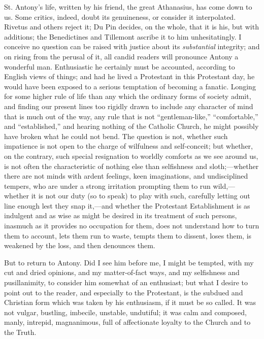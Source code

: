 St. Antony's life, written by his friend, the great Athanasius, has
come down to us. Some critics, indeed, doubt its genuineness, or
consider it interpolated. Rivetus and others reject it; Du Pin
decides, on the whole, that it is his, but with additions; the
Benedictines and Tillemont ascribe it to him unhesitatingly. I
conceive no question can be raised with justice about its \emph{substantial}
integrity; and on rising from the perusal of it, all candid
readers will pronounce Antony a wonderful man. Enthusiastic he
certainly must be accounted, according to English views of things; and
had he lived a Protestant in this Protestant day, he would have been
exposed to a serious temptation of becoming a fanatic. Longing for
some higher rule of life than any which the ordinary forms of society
admit, and finding our present lines too rigidly drawn to include any
character of mind that is much out of the way, any rule that is not
``gentleman-like,'' ``comfortable,'' and
``established,'' and hearing nothing of the Catholic Church,
he might possibly have broken what he could not bend. The question is
not, whether such impatience is not open to the charge of wilfulness
and self-conceit; but whether, on the contrary, such special
resignation to worldly comforts as we see around us, is not often the
characteristic of nothing else than selfishness and sloth;—whether
there are not minds with ardent feelings, keen imaginations, and
undisciplined tempers, who are under a strong irritation prompting
them to run wild,—whether it is not our duty (so to speak) to play
with such, carefully letting out line enough lest they snap it,—and
whether the Protestant Establishment is as indulgent and as wise as
might be desired in its treatment of such persons, inasmuch as it
provides no occupation for them, does not understand how to turn them
to account, lets them run to waste, tempts them to dissent, loses
them, is weakened by the loss, and then denounces them.

But to return to Antony. Did I see him before me, I might be
tempted, with my cut and dried opinions, and my matter-of-fact ways,
and my selfishness and pusillanimity, to consider him somewhat of an
enthusiast; but what I desire to point out to the reader, and
especially to the Protestant, is the subdued and Christian form
which was taken by his enthusiasm, if it must be so called. It was not
vulgar, bustling, imbecile, unstable, undutiful; it was calm and
composed, manly, intrepid, magnanimous, full of affectionate loyalty
to the Church and to the Truth.

